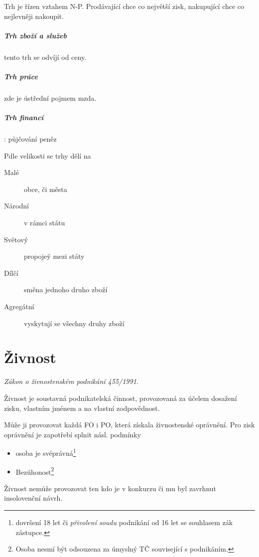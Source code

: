 \documentclass[10pt,a4paper,
twoside,%
]{report}
\begin{document}
Trh je řízen vztahem N-P. Prodávající chce co největší zisk, nakupující chce co nejlevněji nakoupit.

\subparagraph{Trh zboží a služeb} tento trh se odvíjí od ceny.

\subparagraph{Trh práce} zde je ústřední pojmem mzda.

\subparagraph{Trh financí}: půjčování peněz

Pdle velikosti se trhy dělí na 
\begin{description}
\item[Malé] obce, či města
\item[Národní] v rámci státu
\item[Světový] propojeý mezi státy
\item[Dílčí] směna jednoho druho zboží
\item[Agregátní] vyskytují se všechny druhy zboží
\end{description}

\section{Živnost}

\emph{Zákon o živnostenském podnikání 455/1991.}

Živnost je soustavná podnikatelská činnost, provozovaná za účelem dosažení zisku,  vlastním jménem a na vlastní zodpovědnost.

Může ji provozovat každá FO i PO, která získala živnostenské oprávnění. Pro zisk oprávnění je zapotřebí splnit násl. podmínky
\begin{multicols}{2}
\begin{itemize}
\item osoba je svéprávná\footnote{dovršení 18 let či \emph{přivolení soudu} podnikání od 16 let se souhlasem zák zástupce.}
\item Bezúhonost\footnote{Osoba nesmí být odsouzena za úmyslný TČ související s podnikáním.} 
\end{itemize}
\end{multicols}

Živnost nemůže provozovat ten kdo je v konkurzu či mu byl zavrhnut insolovenční návrh.
\end{document}
